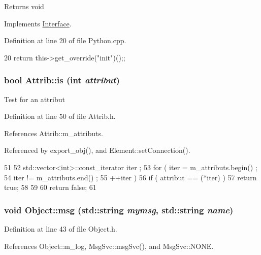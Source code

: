 \begin{DoxyReturn}{Returns}
void 
\end{DoxyReturn}


Implements \hyperlink{classInterface_a1d095c113b1e89d1f5f68323856fee63}{Interface}.

Definition at line 20 of file Python.cpp.


\begin{DoxyCode}
20 {return this->get_override("init")();};
\end{DoxyCode}
\hypertarget{classAttrib_a704f26af560909ad22065083bb7d4c34}{
\subsubsection[{is}]{\setlength{\rightskip}{0pt plus 5cm}bool Attrib::is (int {\em attribut})}}
\label{classAttrib_a704f26af560909ad22065083bb7d4c34}
Test for an attribut 

Definition at line 50 of file Attrib.h.

References Attrib::m\_\-attributs.

Referenced by export\_\-obj(), and Element::setConnection().


\begin{DoxyCode}
51   {
52     std::vector<int>::const_iterator iter ;
53     for ( iter  = m_attributs.begin() ;
54           iter != m_attributs.end()   ;
55           ++iter ) {
56       if ( attribut == (*iter) ) {
57         return true;
58       }
59     }
60     return false;
61   }
\end{DoxyCode}
\hypertarget{classObject_ac5d59299273cee27aacf7de00d2e7034}{
\subsubsection[{msg}]{\setlength{\rightskip}{0pt plus 5cm}void Object::msg (std::string {\em mymsg}, \/  std::string {\em name})}}
\label{classObject_ac5d59299273cee27aacf7de00d2e7034}


Definition at line 43 of file Object.h.

References Object::m\_\-log, MsgSvc::msgSvc(), and MsgSvc::NONE.


